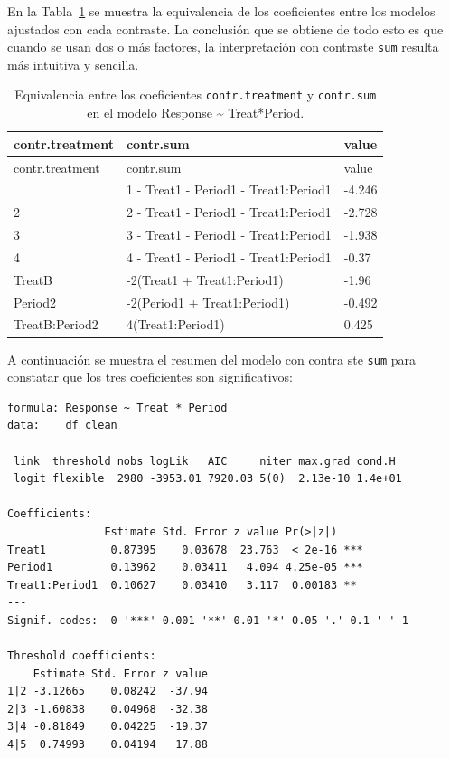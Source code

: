 \documentclass[
  12pt,
  a4paper,
  extrafontsizes,
  onecolumn,
  openright,
  table]{memoir}
\begin{document}
En la Tabla~\ref{tbl-contrat2} se muestra la equivalencia de los
coeficientes entre los modelos ajustados con cada contraste. La
conclusión que se obtiene de todo esto es que cuando se usan dos o más
factores, la interpretación con contraste \texttt{sum} resulta más
intuitiva y sencilla.

\small

\hypertarget{tbl-contrat2}{}
\begin{longtable}[]{@{}lll@{}}
\caption{\label{tbl-contrat2}Equivalencia entre los coeficientes
\texttt{contr.treatment} y \texttt{contr.sum} en el modelo Response
\textasciitilde{} Treat*Period.}\tabularnewline
\toprule\noalign{}
contr.treatment & contr.sum & value \\
\midrule\noalign{}
\endfirsthead
\toprule\noalign{}
contr.treatment & contr.sum & value \\
\midrule\noalign{}
\endhead
\bottomrule\noalign{}
\endlastfoot
1\textbar2 & 1\textbar2 - Treat1 - Period1 - Treat1:Period1 & -4.246 \\
2\textbar3 & 2\textbar3 - Treat1 - Period1 - Treat1:Period1 & -2.728 \\
3\textbar4 & 3\textbar4 - Treat1 - Period1 - Treat1:Period1 & -1.938 \\
4\textbar5 & 4\textbar5 - Treat1 - Period1 - Treat1:Period1 & -0.37 \\
TreatB & -2(Treat1 + Treat1:Period1) & -1.96 \\
Period2 & -2(Period1 + Treat1:Period1) & -0.492 \\
TreatB:Period2 & 4(Treat1:Period1) & 0.425 \\
\end{longtable}

\normalsize

A continuación se muestra el resumen del modelo con contra ste
\texttt{sum} para constatar que los tres coeficientes son
significativos:

\begin{verbatim}
formula: Response ~ Treat * Period
data:    df_clean

 link  threshold nobs logLik   AIC     niter max.grad cond.H 
 logit flexible  2980 -3953.01 7920.03 5(0)  2.13e-10 1.4e+01

Coefficients:
               Estimate Std. Error z value Pr(>|z|)    
Treat1          0.87395    0.03678  23.763  < 2e-16 ***
Period1         0.13962    0.03411   4.094 4.25e-05 ***
Treat1:Period1  0.10627    0.03410   3.117  0.00183 ** 
---
Signif. codes:  0 '***' 0.001 '**' 0.01 '*' 0.05 '.' 0.1 ' ' 1

Threshold coefficients:
    Estimate Std. Error z value
1|2 -3.12665    0.08242  -37.94
2|3 -1.60838    0.04968  -32.38
3|4 -0.81849    0.04225  -19.37
4|5  0.74993    0.04194   17.88
\end{verbatim}
\end{document}
